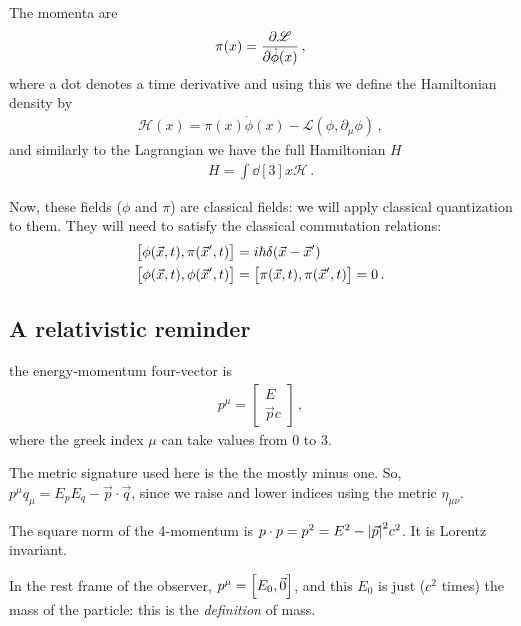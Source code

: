 \documentclass[main.tex]{subfiles}
\begin{document}
The momenta are 
%
\begin{align}
\pi (x) = \pdv{\mathscr{L}}{\dot{\phi} (x)}
\,,
\end{align}
%
where a dot denotes a time derivative
and using this we define the Hamiltonian density by 
%
\begin{align}
\mathscr{H} (x) = \pi (x) \dot{\phi} (x) - \mathscr{L}(\phi, \partial_{\mu }\phi )
\,,
\end{align}
%
and similarly to the Lagrangian we have the full Hamiltonian \(H\)
%
\begin{align}
H = \int \dd[3]{x} \mathscr{H}
\,.
\end{align}

Now, these fields (\(\phi \) and \(\pi \)) are classical fields: we will apply classical quantization to them. 
They will need to satisfy the classical commutation relations: 
%
\begin{align}
\qty[\phi (\vec{x}, t), \pi (\vec{x}', t)] &= i \hbar \delta (\vec{x} - \vec{x}')  \\
\qty[\phi (\vec{x}, t), \phi  (\vec{x}', t)] &=
\qty[\pi (\vec{x}, t), \pi  (\vec{x}', t)] = 0
\,.
\end{align}
%

\subsection{A relativistic reminder}


the energy-momentum four-vector is 
%
\begin{align}
p^{\mu } = \left[\begin{array}{c}
E \\ \vec{p} c
\end{array}\right]
\,,
\end{align}
%
where the greek index \(\mu \) can take values from 0 to 3. 

The metric signature used here is the the mostly minus one. So, \(p^{\mu } q_{\mu } = E_{p} E_{q} - \vec{p} \cdot \vec{q}\), since we raise and lower indices using the metric \(\eta_{\mu \nu }\). 

The square norm of the 4-momentum is \(p \cdot p  = p^2 = E^2 - \abs{\vec{p}}^2 c^2\). It is Lorentz invariant.

In the rest frame of the observer, \(p^{\mu } = \qty[E_{0}, \vec{0}]\), and this \(E_0\) is just (\(c^2\) times)
 the mass of the particle: this is the \emph{definition} of mass. 
\end{document}

